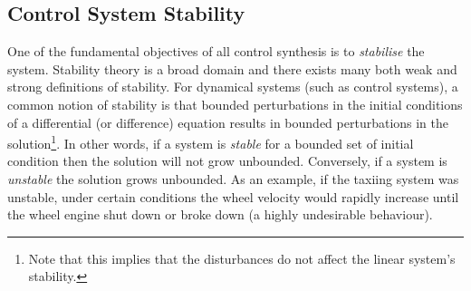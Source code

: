 \subsection{Control System Stability}%
\label{sec:background:stability}%
%
One of the fundamental objectives of all control synthesis is to \emph{stabilise} the system.
Stability theory is a broad domain and there exists many both weak and strong definitions of stability.
For dynamical systems (such as control systems), a common notion of stability is that bounded perturbations in the initial conditions of a differential (or difference) equation results in bounded perturbations in the solution\footnote{Note that this implies that the disturbances do not affect the linear system's stability.}.
In other words, if a system is \emph{stable} for a bounded set of initial condition then the solution will not grow unbounded.
Conversely, if a system is \emph{unstable} the solution grows unbounded.
As an example, if the taxiing system was unstable, under certain conditions the wheel velocity would rapidly increase until the wheel engine shut down or broke down (a highly undesirable behaviour).


